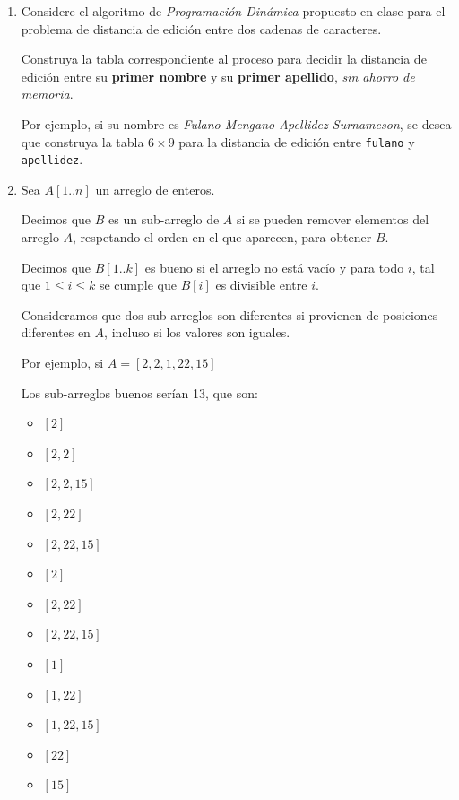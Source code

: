 \documentclass[letterpaper, 12pt]{article}
\begin{document}
\begin{enumerate}


\item Considere el algoritmo de \emph{Programación Dinámica} propuesto en clase para el problema de distancia de edición entre dos cadenas de caracteres.

Construya la tabla correspondiente al proceso para decidir la distancia de edición entre su \textbf{primer nombre} y su \textbf{primer apellido}, \emph{sin ahorro de memoria}.

Por ejemplo, si su nombre es \emph{Fulano Mengano Apellidez Surnameson}, se desea que construya
la tabla $6 \times 9$ para la distancia de edición entre \texttt{fulano} y \texttt{apellidez}.


\item Sea $A[1..n]$ un arreglo de enteros.

Decimos que $B$ es un sub-arreglo de $A$ si se pueden remover elementos del arreglo $A$,
respetando el orden en el que aparecen, para obtener $B$.

Decimos que $B[1..k]$ es bueno si el arreglo no está vacío y para todo $i$, tal que $1 \leq i \leq k$ se
cumple que $B[i]$ es divisible entre $i$.

Consideramos que dos sub-arreglos son diferentes si provienen de posiciones diferentes en $A$, incluso si los valores son iguales.

Por ejemplo, si $A = [2, 2, 1, 22, 15]$

Los sub-arreglos buenos serían 13, que son:

\begin{multicols}{5}
    \begin{itemize}
        \item $[2]$
        \item $[2, 2]$
        \item $[2, 2, 15]$
        \item $[2, 22]$
        \item $[2, 22, 15]$
        \item $[2]$
        \item $[2, 22]$
        \item $[2, 22, 15]$
        \item $[1]$
        \item $[1, 22]$
        \item $[1, 22, 15]$
        \item $[22]$
        \item $[15]$
    \end{itemize}
\end{multicols}


\end{enumerate}
\end{document}
